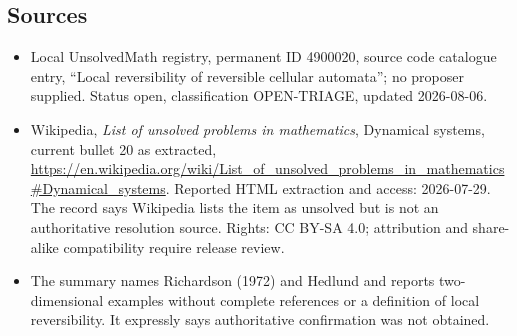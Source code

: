 \documentclass[11pt]{article}
\begin{document}
\subsection{Sources}
\begin{itemize}
\item Local UnsolvedMath registry, permanent ID 4900020, source code catalogue entry, ``Local reversibility of reversible cellular automata''; no proposer supplied. Status open, classification OPEN-TRIAGE, updated 2026-08-06.
\item Wikipedia, \emph{List of unsolved problems in mathematics}, Dynamical systems, current bullet 20 as extracted, \url{https://en.wikipedia.org/wiki/List_of_unsolved_problems_in_mathematics#Dynamical_systems}. Reported HTML extraction and access: 2026-07-29. The record says Wikipedia lists the item as unsolved but is not an authoritative resolution source. Rights: CC BY-SA 4.0; attribution and share-alike compatibility require release review.
\item The summary names Richardson (1972) and Hedlund and reports two-dimensional examples without complete references or a definition of local reversibility. It expressly says authoritative confirmation was not obtained.
\end{itemize}
\end{document}

